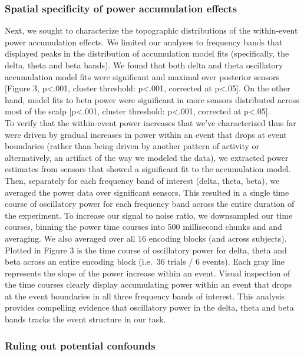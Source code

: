 \subsubsection{Spatial specificity of power accumulation
effects}\label{spatial-specificity-of-power-accumulation-effects}

Next, we sought to characterize the topographic distributions of the
within-event power accumulation effects. We limited our analyses to
frequency bands that displayed peaks in the distribution of accumulation
model fits (specifically, the delta, theta and beta bands). We found
that both delta and theta oscillatory accumulation model fits were
significant and maximal over posterior sensors {[}Figure 3,
p\textless{}.001, cluster threshold: p\textless{}.001, corrected at
p\textless{}.05{]}. On the other hand, model fits to beta power were
significant in more sensors distributed across most of the scalp
{[}p\textless{}.001, cluster threshold: p\textless{}.001, corrected at
p\textless{}.05{]}.\\
To verify that the within-event power increases that we've characterized
thus far were driven by gradual increases in power within an event that
drops at event boundaries (rather than being driven by another pattern
of activity or alternatively, an artifact of the way we modeled the
data), we extracted power estimates from sensors that showed a
significant fit to the accumulation model. Then, separately for each
frequency band of interest (delta, theta, beta), we averaged the power
data over significant sensors. This resulted in a single time course of
oscillatory power for each frequency band across the entire duration of
the experiment. To increase our signal to noise ratio, we downsampled
our time courses, binning the power time courses into 500 millisecond
chunks and and averaging. We also averaged over all 16 encoding blocks
(and across subjects). Plotted in Figure 3 is the time course of
oscillatory power for delta, theta and beta across an entire encoding
block (i.e.~36 trials / 6 events). Each gray line represents the slope
of the power increase within an event. Visual inspection of the time
courses clearly display accumulating power within an event that drops at
the event boundaries in all three frequency bands of interest. This
analysis provides compelling evidence that oscillatory power in the
delta, theta and beta bands tracks the event structure in our task.

\subsubsection{Ruling out potential
confounds}\label{ruling-out-potential-confounds}

